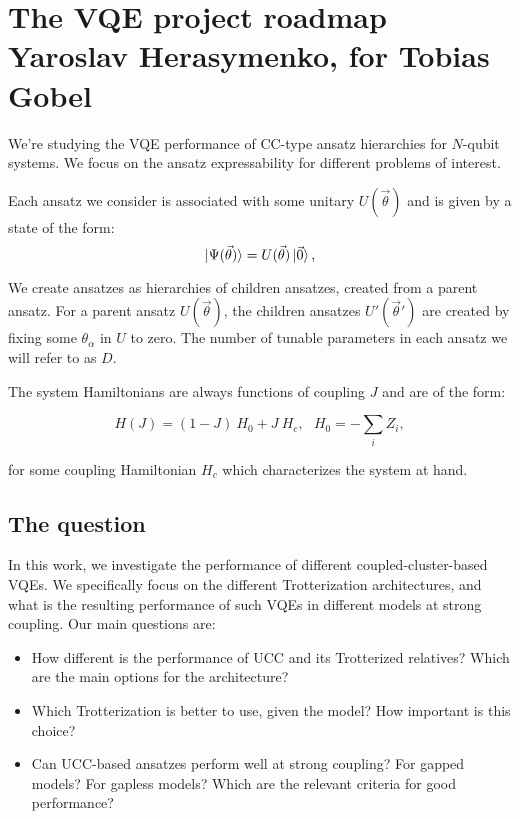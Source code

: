 \documentclass[10pt, a4paper]{article}
\begin{document}
\section*{The VQE project roadmap\\
\small{Yaroslav Herasymenko, for Tobias Gobel}}

We're studying the VQE performance of CC-type ansatz hierarchies for $N$-qubit systems. We focus on the ansatz expressability for different problems of interest. 

Each ansatz we consider is associated with some unitary $U(\vec{\theta})$ and is given by a state of the form:
\begin{equation*}
\ket{\Psi(\vec{\theta})}=U(\vec{\theta})\ket{\vec{0}},
\end{equation*}

We create ansatzes as hierarchies of children ansatzes, created from a parent ansatz. For a parent ansatz $U(\vec{\theta})$, the children ansatzes $U'(\vec{\theta}')$ are created by fixing some $\theta_{\alpha}$ in $U$ to zero. The number of tunable parameters in each ansatz we will refer to as $D$.

The system Hamiltonians are always functions of coupling $J$ and are of the form:

\begin{equation}
H(J)=(1-J)~H_0+J~H_c,~~~H_0=-\sum_i Z_i,
\end{equation}

for some coupling Hamiltonian $H_c$ which characterizes the system at hand.

\subsection*{The question}

In this work, we investigate the performance of different coupled-cluster-based VQEs. We specifically focus on the different Trotterization architectures, and what is the resulting performance of such VQEs in different models at strong coupling. Our main questions are:

\begin{itemize}
\item How different is the performance of UCC and its Trotterized relatives? Which are the main options for the architecture?
\item Which Trotterization is better to use, given the model? How important is this choice?
\item Can UCC-based ansatzes perform well at strong coupling? For gapped models? For gapless models? Which are the relevant criteria for good performance?
\end{itemize}
\end{document}
